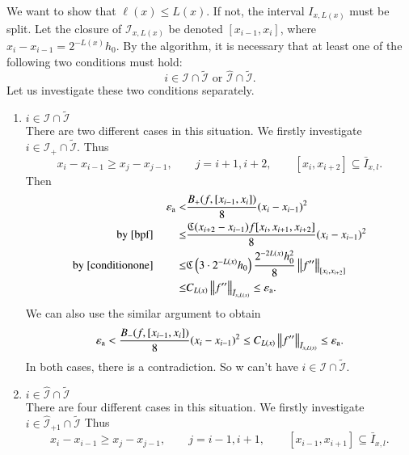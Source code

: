 We want to show that $\ell(x) \le L(x)$. If not, the interval $I_{x,L(x)}$ must be split. Let the closure of $\mathcal{I}_{x,L(x)}$ be
denoted $[x_{i-1},x_i]$, where $x_i-x_{i-1}=2^{-L(x)}h_0$.
By the algorithm, it is necessary that at least one of the following two conditions must hold:
\[i \in \mathcal{I} \cap \widetilde{\mathcal{I}}
\text{ or } \widehat{\mathcal{I}}\cap \widetilde{\mathcal{I}}. \]
Let us investigate these two conditions separately. 
\begin{enumerate}
  \item $i \in \mathcal{I} \cap \widetilde{\mathcal{I}}$\\
  There are two different cases in this situation. We firstly investigate $i \in \mathcal{I}_+ \cap \widetilde{\mathcal{I}}$.
  Thus 
  \begin{equation}
  \label{conditionone} x_{i}-x_{i-1} \ge x_{j}-x_{j-1}, \qquad   j=i+1,i+2, \qquad [x_i,x_{i+2}] \subseteq \bar{I}_{x,l}. 
  \end{equation}
  Then
  \begin{align*}
  \abstol < & \frac{B_+(f,[x_{i-1},x_i])}{8}(x_i-x_{i-1})^2 \\
  \text{by } \eqref{bpf} \qquad \le &\frac{\fC(x_{i+2}-x_{i-1})f[x_{i},x_{i+1},x_{i+2}]}{8}(x_{i}-x_{i-1})^2\\
  \text{by } \eqref{conditionone} \qquad \le & \fC\left(3\cdot2^{-L(x)}h_0\right) \frac{2^{-2L(x)}h_0^2}{8}\norm[{[x_{i},x_{i+2}]}]{f''} \\
     \le & C_{L(x)} \norm[\bar{I}_{x,L(x)}]{f''} \le \abstol.
  \end{align*}
  We can also use the similar argument to obtain
   \begin{align*}
  \abstol < \frac{B_-(f,[x_{i-1},x_i])}{8}(x_i-x_{i-1})^2  \le
      C_{L(x)} \norm[\bar{I}_{x,L(x)}]{f''} \le \abstol.
  \end{align*}
  In both cases, there is a contradiction. So w can't have $i \in \mathcal{I} \cap \widetilde{\mathcal{I}}$.
  \item $i \in \widehat{\mathcal{I}}\cap \widetilde{\mathcal{I}}$\\
  There are four different cases in this situation. We firstly investigate $i \in \widehat{\mathcal{I}}_{+1} \cap \widetilde{\mathcal{I}}$
  Thus
  \begin{equation} \label{conditiontwo}
  x_{i}-x_{i-1} \ge x_{j}-x_{j-1},\qquad j=i-1,i+1, \qquad [x_{i-1},x_{i+1}] \subseteq \bar{I}_{x,l}.
  \end{equation}

\end{enumerate}
